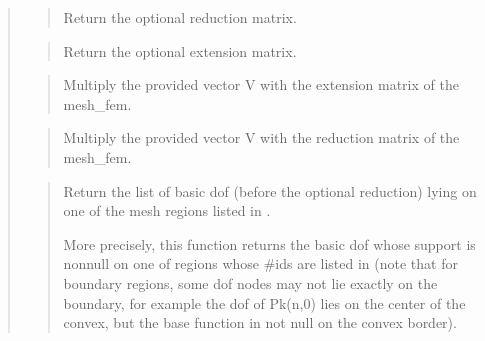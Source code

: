 \documentclass[a4paper,11pt,english]{sphinxmanual}
\begin{document}
\begin{quote}
\sphinxAtStartPar
{}
\begin{quote}

\sphinxAtStartPar
Return the optional reduction matrix.
\end{quote}

\sphinxAtStartPar
{}
\begin{quote}

\sphinxAtStartPar
Return the optional extension matrix.
\end{quote}

\sphinxAtStartPar
{}
\begin{quote}

\sphinxAtStartPar
Multiply the provided vector V with the extension matrix of the mesh\_fem.
\end{quote}

\sphinxAtStartPar
{}
\begin{quote}

\sphinxAtStartPar
Multiply the provided vector V with the reduction matrix of the mesh\_fem.
\end{quote}

\sphinxAtStartPar
{}
\begin{quote}

\sphinxAtStartPar
Return the list of basic dof (before the optional reduction) lying on one
of the mesh regions listed in .

\sphinxAtStartPar
More precisely, this function returns the basic dof whose support is
non\sphinxhyphen{}null on one of regions whose \#ids are listed in  (note
that for boundary regions, some dof nodes may not lie exactly
on the boundary, for example the dof of Pk(n,0) lies on the center
of the convex, but the base function in not null on the convex
border).
\end{quote}

\sphinxAtStartPar
{}
\begin{quote}


\end{quote}
\end{quote}
\end{document}
